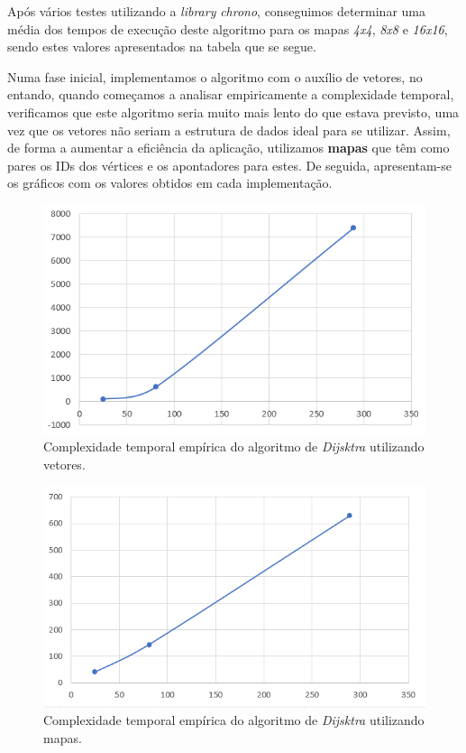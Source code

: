 \documentclass[article, a4paper, 12pt, oneside]{memoir}
\begin{document}
Após vários testes utilizando a \textit{library} \textit{chrono}, conseguimos determinar uma média dos tempos de execução deste algoritmo para os mapas \textit{4x4}, \textit{8x8} e \textit{16x16}, sendo estes valores apresentados na tabela que se segue. 

Numa fase inicial, implementamos o algoritmo com o auxílio de vetores, no entando, quando começamos a analisar empiricamente a complexidade temporal, verificamos que este algoritmo seria muito mais lento do que estava previsto, uma vez que os vetores não seriam a estrutura de dados ideal para se utilizar. Assim, de forma a aumentar a eficiência da aplicação, utilizamos \textbf{mapas} que têm como pares os IDs dos vértices e os apontadores para estes. De seguida, apresentam-se os gráficos com os valores obtidos em cada implementação.

\begin{figure}[h!]
  \centerline{\includegraphics[scale=0.6]{dijkstra_empirica.png}}
  \caption{Complexidade temporal empírica do algoritmo de \textit{Dijsktra} utilizando vetores.}
\end{figure}

\begin{figure}[h!]
  \centerline{\includegraphics[scale=0.6]{dijkstra_empirica_mapas.png}}
  \caption{Complexidade temporal empírica do algoritmo de \textit{Dijsktra} utilizando mapas.}
\end{figure}
\end{document}
